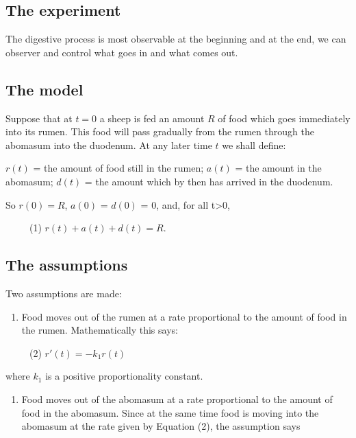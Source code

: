 \documentclass[]{article}
\providecommand{\tightlist}{%
  \setlength{\itemsep}{0pt}\setlength{\parskip}{0pt}}
\begin{document}
\subsection{The experiment}\label{the-experiment}

The digestive process is most observable at the beginning and at the
end, we can observer and control what goes in and what comes out.

\subsection{The model}\label{the-model}

Suppose that at \(t = 0\) a sheep is fed an amount \(R\) of food which
goes immediately into its rumen. This food will pass gradually from the
rumen through the abomasum into the duodenum. At any later time \(t\) we
shall define:

\(r(t)\) = the amount of food still in the rumen; \(a(t)\) = the amount
in the abomasum; \(d(t)\) = the amount which by then has arrived in the
duodenum.

So \(r(0) = R\), \(a(0)\) = \(d(0)\) = 0, and, for all t\textgreater{}0,

~~~~~(1) \(r(t) + a(t) + d(t) = R.\)

\subsection{The assumptions}\label{the-assumptions}

Two assumptions are made:

\begin{enumerate}
\def\labelenumi{(\Alph{enumi})}
\tightlist
\item
  Food moves out of the rumen at a rate proportional to the amount of
  food in the rumen. Mathematically this says:
\end{enumerate}

~~~~~(2) \(r'(t) = -k_1r(t)\)

where \(k_1\) is a positive proportionality constant.

\begin{enumerate}
\def\labelenumi{(\Alph{enumi})}
\setcounter{enumi}{1}
\tightlist
\item
  Food moves out of the abomasum at a rate proportional to the amount of
  food in the abomasum. Since at the same time food is moving into the
  abomasum at the rate given by Equation (2), the assumption says
\end{enumerate}
\end{document}
